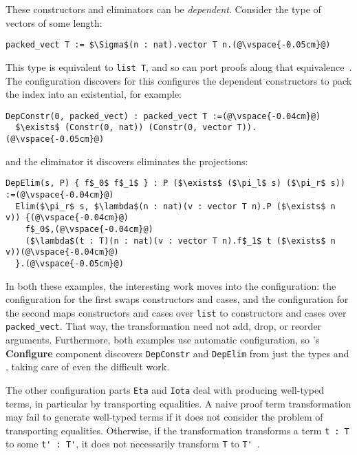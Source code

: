 These constructors and eliminators can be \textit{dependent}.
Consider the type of vectors of some length:

\begin{lstlisting}
packed_vect T := $\Sigma$(n : nat).vector T n.(@\vspace{-0.05cm}@)
\end{lstlisting}
This type is equivalent to \lstinline{list T}, and so \toolname can port proofs along that equivalence~. %
The configuration \toolname discovers for this configures the dependent constructors to pack the index into an existential, for example:

\begin{lstlisting}
DepConstr(0, packed_vect) : packed_vect T :=(@\vspace{-0.04cm}@)
  $\exists$ (Constr(0, nat)) (Constr(0, vector T)).(@\vspace{-0.05cm}@)
\end{lstlisting}
and the eliminator it discovers eliminates the projections:

\begin{lstlisting}
DepElim(s, P) { f$_0$ f$_1$ } : P ($\exists$ ($\pi_l$ s) ($\pi_r$ s)) :=(@\vspace{-0.04cm}@)
  Elim($\pi_r$ s, $\lambda$(n : nat)(v : vector T n).P ($\exists$ n v)) {(@\vspace{-0.04cm}@)
    f$_0$,(@\vspace{-0.04cm}@)
    ($\lambda$(t : T)(n : nat)(v : vector T n).f$_1$ t ($\exists$ n v))(@\vspace{-0.04cm}@)
  }.(@\vspace{-0.05cm}@) 
\end{lstlisting}

In both these examples, the interesting work moves into the configuration:
the configuration for the first swaps constructors and cases,
and the configuration for the second maps constructors and cases over \lstinline{list} to constructors and cases over \lstinline{packed_vect}. %
That way, the transformation need not add, drop, or reorder arguments.
Furthermore, both examples use automatic configuration, so \toolname's \textbf{Configure} component 
discovers \lstinline{DepConstr} and \lstinline{DepElim} from just the types \A and \B, taking care of even the difficult work.

The other configuration parts \lstinline{Eta} and \lstinline{Iota} deal with producing well-typed terms,
in particular by transporting equalities.
A naive proof term transformation
may fail to generate well-typed terms if it does not consider the problem of transporting equalities.
Otherwise, if the transformation transforms a term \lstinline{t : T} to some \lstinline{t' : T'}, it does not necessarily
transform \lstinline{T} to \lstinline{T'}~\cite{tabareau2019marriage}.

